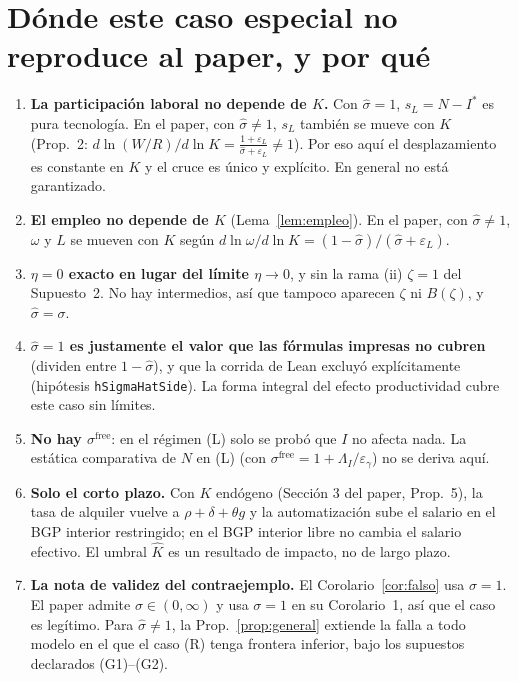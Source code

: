 \documentclass[11pt,a4paper]{article}
\numberwithin{equation}{section}
\theoremstyle{definition}
\theoremstyle{plain}
\theoremstyle{remark}
\newcommand{\Is}{I^{*}}
\newcommand{\Kh}{\hat K}
\newcommand{\eps}{\varepsilon}
\newcommand{\sh}{\hat\sigma}
\begin{document}
\section{Dónde este caso especial no reproduce al paper, y por qué}\label{sec:noreproduce}

\begin{enumerate}[label=(\arabic*)]
  \item \textbf{La participación laboral no depende de $K$.} Con $\sh=1$, $s_L=N-\Is$ es pura tecnología. En el paper,
        con $\sh\ne1$, $s_L$ también se mueve con $K$ (Prop.~2: $d\ln(W/R)/d\ln K=\frac{1+\eps_L}{\sh+\eps_L}\neq1$).
        Por eso aquí el desplazamiento es constante en $K$ y el cruce es único y explícito. En general no está garantizado.
  \item \textbf{El empleo no depende de $K$} (Lema~\ref{lem:empleo}). En el paper, con $\sh\ne1$, $\omega$ y $L$ se mueven
        con $K$ según $d\ln\omega/d\ln K=(1-\sh)/(\sh+\eps_L)$.
  \item \textbf{$\eta=0$ exacto en lugar del límite $\eta\to0$}, y sin la rama (ii) $\zeta=1$ del Supuesto~2. No hay
        intermedios, así que tampoco aparecen $\zeta$ ni $B(\zeta)$, y $\sh=\sigma$.
  \item \textbf{$\sh=1$ es justamente el valor que las fórmulas impresas no cubren} (dividen entre $1-\sh$), y que la
        corrida de Lean excluyó explícitamente (hipótesis \texttt{hSigmaHatSide}). La forma integral del efecto
        productividad cubre este caso sin límites.
  \item \textbf{No hay $\sigma^{\text{free}}$}: en el régimen (L) solo se probó que $I$ no afecta nada. La estática
        comparativa de $N$ en (L) (con $\sigma^{\text{free}}=1+\Lambda_I/\eps_\gamma$) no se deriva aquí.
  \item \textbf{Solo el corto plazo.} Con $K$ endógeno (Sección 3 del paper, Prop.~5), la tasa de alquiler vuelve a
        $\rho+\delta+\theta g$ y la automatización sube el salario en el BGP interior restringido; en el BGP interior libre no cambia el salario efectivo. El umbral
        $\Kh$ es un resultado de impacto, no de largo plazo.
  \item \textbf{La nota de validez del contraejemplo.} El Corolario~\ref{cor:falso} usa $\sigma=1$. El paper admite
        $\sigma\in(0,\infty)$ y usa $\sigma=1$ en su Corolario~1, así que el caso es legítimo. Para $\sh\ne1$, la
        Prop.~\ref{prop:general} extiende la falla a todo modelo en el que el caso (R) tenga frontera inferior, bajo los
        supuestos declarados (G1)–(G2).
\end{enumerate}
\end{document}
